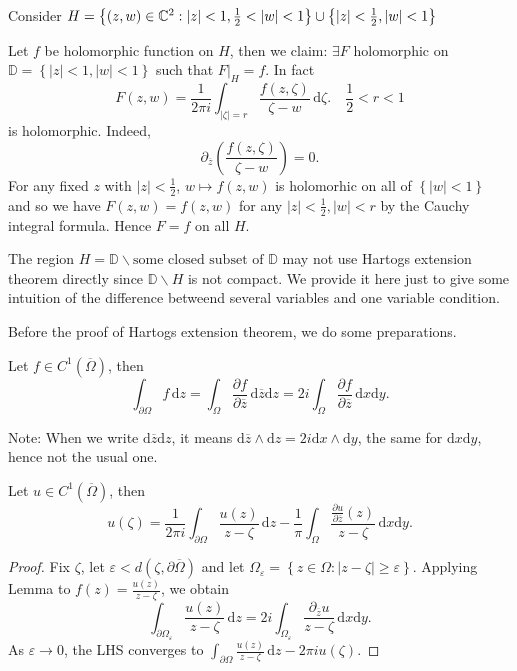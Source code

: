 \begin{example}
  Consider $H=\left\{(z,w)\in \C^2:|z|<1, \frac{1}{2}<|w|<1\right\}\cup \left\{|z|<\frac{1}{2},|w|<1\right\}  $

\begin{figure}[ht]
    \centering
    \caption{}
    \label{fig:fig1}
\end{figure}
Let $f$ be holomorphic function on $H$, then we claim: $\exists F$ holomorphic  on $\mathbb{D}=\left\{|z|<1,|w|<1\right\} $ such that $F|_{H}=f$.
In fact 
\[
  F(z,w)=\frac{1}{2\pi i }\int_{|\zeta|=r} \frac{f(z,\zeta)}{\zeta-w}\,\mathrm{d}\zeta.\quad  \frac{1}{2}<r<1
\] 
is holomorphic. Indeed, 
\[
  \partial_{\overline{z}}\left( \frac{f(z,\zeta)}{\zeta-w} \right) =0. 
\] 
For any fixed $z$ with $|z|<\frac{1}{2}$, $w\mapsto f(z,w)$ is holomorhic on all of $\left\{|w|<1\right\} $ and so we have $F(z,w)=f(z,w)$ for any $|z|<\frac{1}{2},|w|<r$ by the Cauchy integral formula. Hence $F=f$ on all $H$.

The region $H=\mathbb{D}\backslash \text{some closed subset of }\mathbb{D}$ may not use Hartogs extension theorem directly since $\mathbb{D}\backslash H$ is not compact. We provide it here just to give some intuition of the difference betweend several variables and one variable condition.
\end{example}
Before the proof of Hartogs extension theorem, we do some preparations.
\begin{lemma}
  Let $f\in C^1(\overline{\Omega})$, then 
  \[
  \int_{\partial \Omega}f\,\mathrm{d}z=\int_{\Omega}\frac{\partial f}{\partial \overline{z}} \,\mathrm{d}\overline{z}\mathrm{d}z=2 i \int_{\Omega}\frac{\partial f}{\partial \overline{z}} \,\mathrm{d}x\mathrm{d}y.
  \] 
\end{lemma}
Note: When we write $\mathrm{d}\overline{z}\mathrm{d}z$, it means $\mathrm{d}\overline{z}\wedge \mathrm{d}z=2 i \mathrm{d}x\wedge \mathrm{d}y$, the same for $\mathrm{d}x\mathrm{d}y$, hence not the usual one.
\begin{proposition}
  Let $u\in C^{1}(\overline{\Omega})$, then 
  \[
    u(\zeta)=\frac{1}{2\pi i}\int_{\partial \Omega} \frac{u(z)}{z-\zeta}\,\mathrm{d}z-\frac{1}{\pi}\int_{\Omega}\frac{\frac{\partial u}{\partial \overline{z}} (z)}{z-\zeta}\,\mathrm{d}x\mathrm{d}y.
  \] 
\end{proposition}
\begin{proof}
  Fix $\zeta$, let $\varepsilon <d\left( \zeta,\partial \overline{\Omega} \right) $ and let $\Omega_\varepsilon =\left\{z\in  \Omega:|z-\zeta|\ge\varepsilon \right\} $. Applying Lemma to $f(z)=\frac{u(z)}{z-\zeta}$, we obtain
  \[
    \int_{\partial \Omega_\varepsilon } \frac{u(z)}{z-\zeta}\,\mathrm{d}z=2i \int_{\Omega_\varepsilon }\frac{\partial_{\overline{z}}u}{z-\zeta}\,\mathrm{d}x\mathrm{d}y.
  \] 
  As $\varepsilon \to 0$, the LHS converges to $\int_{\partial \Omega} \frac{u(z)}{z-\zeta}\,\mathrm{d}z-2\pi i u(\zeta)$.
\end{proof}
